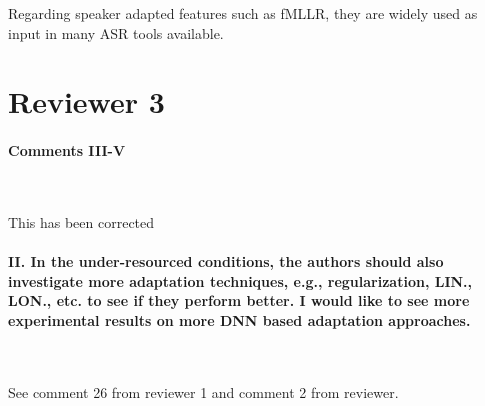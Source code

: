 \documentclass[]{article}
\begin{document}
Regarding speaker adapted features such as fMLLR, they are widely used as input in many ASR tools available. 

\section{Reviewer 3}

\paragraph{Comments III-V}

~

This has been corrected

\paragraph{II. In the under-resourced conditions, the authors should also investigate more adaptation techniques, e.g., regularization, LIN., LON., etc. to see if they perform better. I would like to see more experimental results on more DNN based adaptation approaches.}

~

See comment 26 from reviewer 1 and comment 2 from reviewer.
\end{document}
